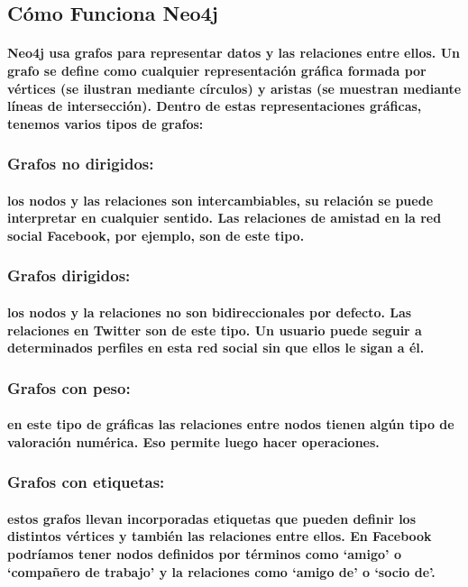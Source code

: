 \subsection{Cómo Funciona Neo4j}
\paragraph{Neo4j usa grafos para representar datos y las relaciones entre ellos. Un grafo se define como cualquier representación gráfica formada por vértices (se ilustran mediante círculos) y aristas (se muestran mediante líneas de intersección). Dentro de estas representaciones gráficas, tenemos varios tipos de grafos:}
\subsubsection{ Grafos no dirigidos:}
	 \paragraph{los nodos y las relaciones son intercambiables, su relación se puede interpretar en cualquier sentido. 	Las relaciones de amistad en la red social Facebook, por ejemplo, son de este tipo.}
\subsubsection{ Grafos dirigidos:}
	 \paragraph{los nodos y la relaciones no son bidireccionales por defecto. Las relaciones en Twitter son de este      	tipo. Un usuario puede seguir a determinados perfiles en esta red social sin que ellos le sigan a él.}
\newpage
\subsubsection{Grafos con peso:}
	\paragraph{en este tipo de gráficas las relaciones entre nodos tienen algún tipo de valoración numérica. Eso permite luego hacer operaciones.}	 
\subsubsection{Grafos con etiquetas:}
	\paragraph{estos grafos llevan incorporadas etiquetas que pueden definir los distintos vértices y también las relaciones entre ellos. En Facebook podríamos tener nodos definidos por términos como ‘amigo’ o ‘compañero de trabajo’ y la relaciones como ‘amigo de’ o ‘socio de’.}

